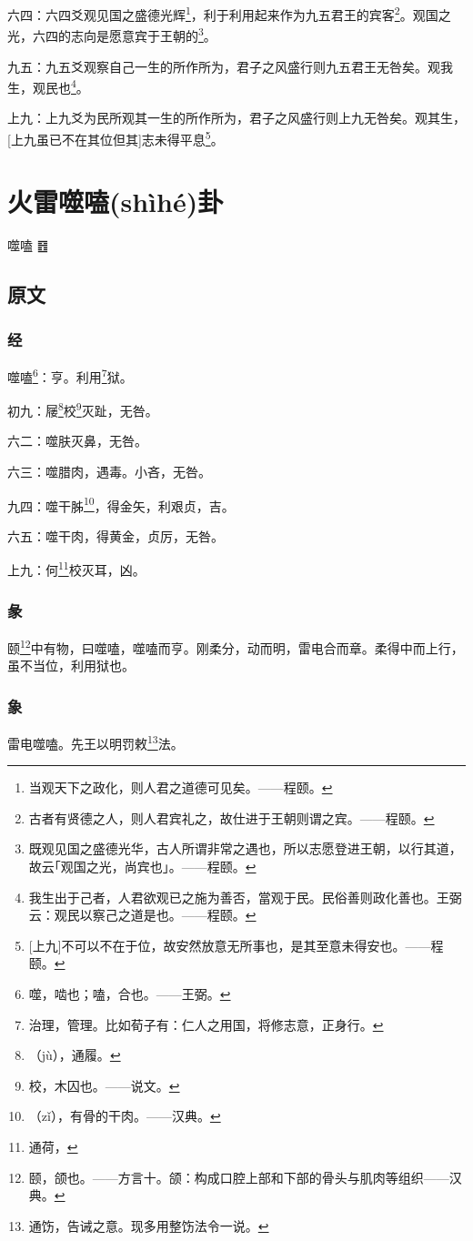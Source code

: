 \documentclass[12pt,oneside]{book}
\begin{document}
六四：六四爻观见国之盛德光辉\footnote{当观天下之政化，则人君之道德可见矣。——程颐。}，利于利用起来作为九五君王的宾客\footnote{古者有贤德之人，则人君宾礼之，故仕进于王朝则谓之宾。——程颐。}。观国之光，六四的志向是愿意宾于王朝的\footnote{既观见国之盛德光华，古人所谓非常之遇也，所以志愿登进王朝，以行其道，故云｢观国之光，尚宾也｣。——程颐。}。

九五：九五爻观察自己一生的所作所为，君子之风盛行则九五君王无咎矣。观我生，观民也\footnote{我生出于己者，人君欲观已之施为善否，當观于民。民俗善则政化善也。王弼云：观民以察己之道是也。——程颐。}。

上九：上九爻为民所观其一生的所作所为，君子之风盛行则上九无咎矣。观其生，[上九虽已不在其位但其]志未得平息\footnote{[上九]不可以不在于位，故安然放意无所事也，是其至意未得安也。——程颐。}。


\chapter{火雷噬嗑(shìhé)卦}
噬嗑 {\Large ䷔}

\section{原文}

\subsection{经}
噬嗑\footnote{噬，啮也；嗑，合也。——王弼。}：亨。利用\footnote{治理，管理。比如荀子有：仁人之用国，将修志意，正身行。}狱。

初九：屦\footnote{（jù），通履。}校\footnote{校，木囚也。——说文。}灭趾，无咎。

六二：噬肤灭鼻，无咎。

六三：噬腊肉，遇毒。小吝，无咎。

九四：噬干胏\footnote{（zǐ），有骨的干肉。——汉典。}，得金矢，利艰贞，吉。

六五：噬干肉，得黄金，贞厉，无咎。

上九：何\footnote{通荷，}校灭耳，凶。

\subsection{彖}
颐\footnote{颐，颌也。——方言十。颌：构成口腔上部和下部的骨头与肌肉等组织——汉典。}中有物，曰噬嗑，噬嗑而亨。刚柔分，动而明，雷电合而章。柔得中而上行，虽不当位，利用狱也。

\subsection{象}
雷电噬嗑。先王以明罚敕\footnote{通饬，告诫之意。现多用整饬法令一说。}法。
\end{document}
